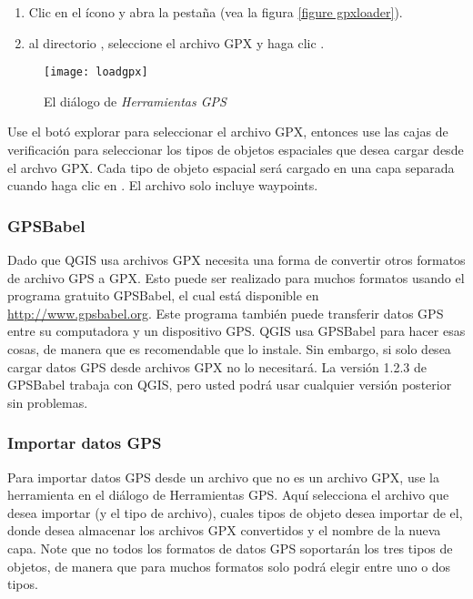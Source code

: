\begin{enumerate}
\item Clic en el ícono  y abra la
pestaña  (vea la figura \ref{figure gpxloader}).
\item {} al directorio ,
seleccione el archivo GPX  y haga clic .
\end{enumerate}

\begin{figure}[ht]
   \begin{center}
\caption{\label{gpxloader}El diálogo de \emph{Herramientas GPS} \nixcaption}
\texttt{[image: loadgpx]}
\end{center}
\end{figure}

Use el botó explorar \browsebutton para seleccionar el archivo GPX, entonces use las
cajas de verificación para seleccionar los tipos de objetos espaciales que desea cargar desde el archvo GPX.
Cada tipo de objeto espacial será cargado en una capa separada cuando haga clic en .
El archivo  solo incluye waypoints.

\subsubsection{GPSBabel}

Dado que QGIS usa archivos GPX necesita una forma de convertir otros formatos de archivo GPS a GPX.
Esto puede ser realizado para muchos formatos usando el programa gratuito GPSBabel, el cual está disponible en \url{http://www.gpsbabel.org}.
Este programa también puede transferir datos GPS entre su computadora y un dispositivo GPS.
QGIS usa GPSBabel para hacer esas cosas, de manera que es recomendable que lo instale.
Sin embargo, si solo desea cargar datos GPS desde archivos GPX no lo necesitará.
La versión 1.2.3 de GPSBabel trabaja con QGIS, pero usted podrá usar cualquier versión posterior sin problemas.


\subsubsection{Importar datos GPS}

Para importar datos GPS desde un archivo que no es un archivo GPX, use la herramienta  en el diálogo de Herramientas GPS.
Aquí selecciona el archivo que desea importar (y el tipo de archivo), cuales tipos de objeto desea importar de el, donde desea almacenar los archivos GPX convertidos y el nombre de la nueva capa. Note que no todos los formatos de datos GPS soportarán los tres tipos de objetos, de manera que para muchos formatos solo podrá elegir entre uno o dos tipos.  


